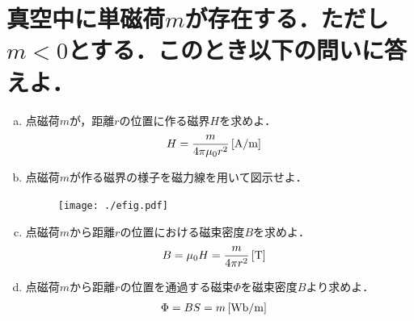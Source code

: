 \documentclass[dvipdfmx]{ujarticle}
\begin{document}
\section{真空中に単磁荷$m$が存在する．ただし$m<0$とする．このとき以下の問いに答えよ．}
\begin{enumerate}[(a)]
	\item 点磁荷$m$が，距離$r$の位置に作る磁界$H$を求めよ．
	\begin{align*}
		H&=\frac{m}{4 \pi \mu_{0} r^{2}}\,[\rm{A/m}]
	\end{align*}
	\item 点磁荷$m$が作る磁界の様子を磁力線を用いて図示せよ．
	\begin{figure}[h]
	\centering
	\texttt{[image: ./efig.pdf]}
	\end{figure}
	\item 点磁荷$m$から距離$r$の位置における磁束密度$B$を求めよ．
	\begin{align*}
		B&=\mu_{0} H=\frac{m}{4 \pi r^{2}}\,[\rm{T}]
	\end{align*}
	\item 点磁荷$m$から距離$r$の位置を通過する磁束$\Phi$を磁束密度$B$より求めよ．
	\begin{align*}
		\Phi&=BS=m\,[\rm{Wb/m}]
	\end{align*}
\end{enumerate}
\end{document}
